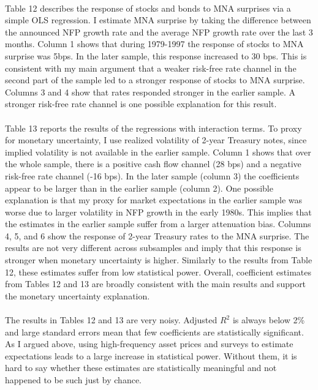 \documentclass[12pt]{article}
\begin{document}
\paragraph{}
Table 12 describes the response of stocks and bonds to MNA surprises via a simple OLS regression. I estimate MNA surprise by taking the difference between the announced NFP growth rate and the average NFP growth rate over the last 3 months. Column 1 shows that during 1979-1997 the response of stocks to MNA surprise was 5bps. In the later sample, this response increased to 30 bps. This is consistent with my main argument that a weaker risk-free rate channel in the second part of the sample led to a stronger response of stocks to MNA surprise. Columns 3 and 4 show that rates responded stronger in the earlier sample. A stronger risk-free rate channel is one possible explanation for this result.
\paragraph{}
Table 13 reports the results of the regressions with interaction terms. To proxy for monetary uncertainty, I use realized volatility of 2-year Treasury notes, since implied volatility is not available in the earlier sample. Column 1 shows that over the whole sample, there is a positive cash flow channel (28 bps) and a negative risk-free rate channel (-16 bps). In the later sample (column 3) the coefficients appear to be larger than in the earlier sample (column 2). One possible explanation is that my proxy for market expectations in the earlier sample was worse due to larger volatility in NFP growth in the early 1980s. This implies that the estimates in the earlier sample suffer from a larger attenuation bias. Columns 4, 5, and 6 show the response of 2-year Treasury rates to the MNA surprise. The results are not very different across subsamples and imply that this response is stronger when monetary uncertainty is higher. Similarly to the results from Table 12, these estimates suffer from low statistical power. Overall, coefficient estimates from Tables 12 and 13 are broadly consistent with the main results and support the monetary uncertainty explanation.
\paragraph{}
The results in Tables 12 and 13 are very noisy. Adjusted $R^2$ is always below 2\% and large standard errors mean that few coefficients are statistically significant. As I argued above, using high-frequency asset prices and surveys to estimate expectations leads to a large increase in statistical power. Without them, it is hard to say whether these estimates are statistically meaningful and not happened to be such just by chance.
\end{document}
